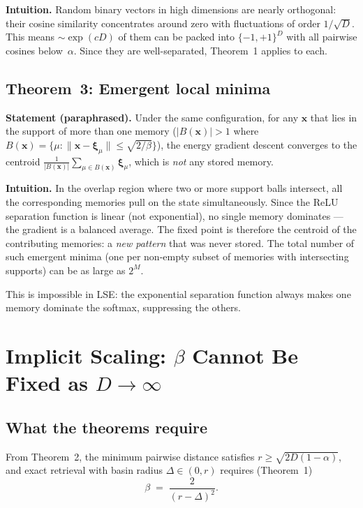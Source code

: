 \documentclass[11pt]{article}
\begin{document}
\textbf{Intuition.}
Random binary vectors in high dimensions are nearly orthogonal: their cosine
similarity concentrates around zero with fluctuations of order $1/\sqrt{D}$.
This means $\sim\!\exp(cD)$ of them can be packed into $\{-1,+1\}^D$ with all
pairwise cosines below~$\alpha$.  Since they are well-separated, Theorem~1
applies to each.

\subsection{Theorem~3: Emergent local minima}

\textbf{Statement (paraphrased).}
Under the same configuration, for any $\mathbf{x}$ that lies in the support
of more than one memory ($|B(\mathbf{x})| > 1$ where
$B(\mathbf{x}) = \{\mu : \|\mathbf{x}-\boldsymbol{\xi}_\mu\|\leq\sqrt{2/\beta}\}$),
the energy gradient descent converges to the centroid
$\frac{1}{|B(\mathbf{x})|}\sum_{\mu\in B(\mathbf{x})}\boldsymbol{\xi}_\mu$,
which is \emph{not} any stored memory.

\textbf{Intuition.}
In the overlap region where two or more support balls intersect, all the
corresponding memories pull on the state simultaneously.  Since the ReLU
separation function is linear (not exponential), no single memory dominates ---
the gradient is a balanced average.  The fixed point is therefore the centroid
of the contributing memories: a \emph{new pattern} that was never stored.
The total number of such emergent minima (one per non-empty subset of memories
with intersecting supports) can be as large as $2^M$.

This is impossible in LSE: the exponential separation function always makes
one memory dominate the softmax, suppressing the others.

\section{Implicit Scaling: $\beta$ Cannot Be Fixed as $D\to\infty$}

\subsection{What the theorems require}

From Theorem~2, the minimum pairwise distance satisfies
$r \geq \sqrt{2D(1-\alpha)}$, and exact retrieval with basin radius
$\Delta \in (0,r)$ requires (Theorem~1)
\begin{equation}\label{eq:beta-bound}
  \beta \;=\; \frac{2}{(r-\Delta)^2}.
\end{equation}
\end{document}
